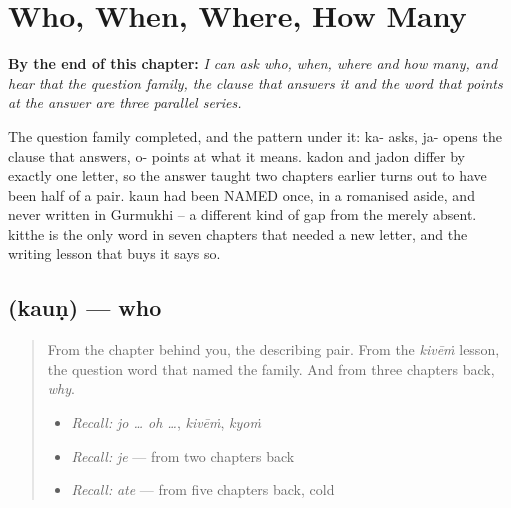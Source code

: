 
\chapter{Who, When, Where, How Many}
\label{ch:pa-question-words}

\begin{chapteropening}
\textbf{By the end of this chapter:} \emph{I can ask who, when, where and how many, and hear that the question family, the clause that answers it and the word that points at the answer are three parallel series.}

The question family completed, and the pattern under it: ka- asks, ja- opens the clause that answers, o- points at what it means. kadon and jadon differ by exactly one letter, so the answer taught two chapters earlier turns out to have been half of a pair. kaun had been NAMED once, in a romanised aside, and never written in Gurmukhi -- a different kind of gap from the merely absent. kitthe is the only word in seven chapters that needed a new letter, and the writing lesson that buys it says so.
\end{chapteropening}

\section[\texorpdfstring{\pa{ਕੌਣ} (kauṇ)}{ਕੌਣ (kauṇ)}]{ (kauṇ) — who}

\label{lesson:PA-C43-kaun}



\begin{quote}
From the chapter behind you, the describing pair. From the \emph{kivēṁ} lesson, the question word that named the family. And from three chapters back, \emph{why}.

\begin{itemize}
\raggedright
  \item \emph{Recall:} \emph{jo … oh …}, \emph{kivēṁ}, \emph{kyoṁ}
  \item \emph{Recall:} \emph{je} — from two chapters back
  \item \emph{Recall:} \emph{ate} — from five chapters back, cold
\end{itemize}
\end{quote}

